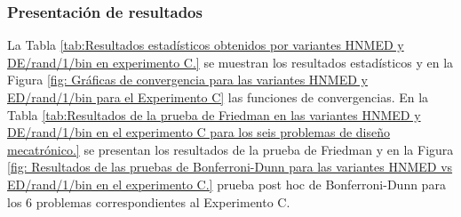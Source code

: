 \begin{table}[]
	\centering
	\caption{Tamaños de población utilizados para cada problema en el Experimento C.}
	\label{tab:Tamaños de población utilizados para cada problema en el Experimento C.}
\end{table}


\subsubsection{Presentación de resultados}
La Tabla \ref{tab:Resultados estadísticos obtenidos por variantes HNMED y DE/rand/1/bin  en experimento C.} se muestran los resultados estadísticos y en la Figura \ref{fig: Gráficas de convergencia para las variantes HNMED y ED/rand/1/bin para el Experimento C} las funciones de convergencias. En la Tabla \ref{tab:Resultados de la prueba de Friedman en las variantes HNMED y DE/rand/1/bin en el experimento C para los seis problemas de diseño mecatrónico.} se presentan los resultados de la prueba de Friedman y en la Figura \ref{fig: Resultados de las pruebas de Bonferroni-Dunn para las variantes HNMED vs ED/rand/1/bin en el experimento C.} prueba post hoc de Bonferroni-Dunn para los 6 problemas correspondientes al Experimento C.


